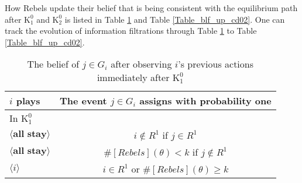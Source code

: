 \documentclass[12pt,letter]{article}
\newcommand{\Kappa}{\mathrm{K}}
\theoremstyle{definition}
\theoremstyle{remark}
\theoremstyle{claim}
\begin{document}
\clearpage

How Rebels update their belief that is being consistent with the equilibrium path after $\Kappa^0_1$ and $\Kappa^0_2$ is listed in Table \ref{Table_blf_up_cd01} and Table \ref{Table_blf_up_cd02}. One can track the evolution of information filtrations through Table \ref{Table_blf_up_cd01} to Table \ref{Table_blf_up_cd02}.

\begin{table}[!htbp]
\caption{The belief of $j\in G_i$ after observing $i$'s previous actions immediately after $\Kappa^0_{1}$}
\label{Table_blf_up_cd01}
\begin{center}
\begin{tabular}{l | c}
 	$i$ plays	  				  &  The event $j\in G_i$ assigns with probability one\\
\hline
\hline
In $\Kappa^0_{1}$	&				  \\
\hline
  $\langle \textbf{all stay} \rangle$	&    $i\notin R^1$ if $j\in R^1$ \\
  $\langle \textbf{all stay} \rangle$	&    $\#[Rebels](\theta)< k$ if $j\notin R^1$\\
  $\langle i \rangle$	&	  $i\in R^1$ or $\#[Rebels](\theta)\geq k$    \\
  \hline
\end{tabular}
\end{center}
\end{table}
\end{document}
